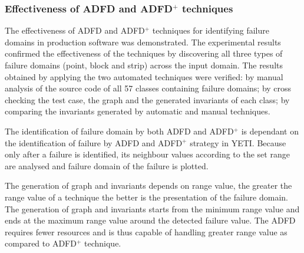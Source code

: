 






\subsubsection{Effectiveness of ADFD and ADFD$^+$ techniques}
The effectiveness of ADFD and ADFD$^+$ techniques for identifying failure domains in production software was demonstrated. The experimental results confirmed the effectiveness of the techniques by discovering all three types of failure domains (point, block and strip) across the input domain. The results obtained by applying the two automated techniques were verified: by manual analysis of the source code of all 57 classes containing failure domains; by cross checking the test case, the graph and the generated invariants of each class; by comparing the invariants generated by automatic and manual techniques. 

The identification of failure domain by both ADFD and ADFD$^+$ is dependant on the identification of failure by ADFD and ADFD$^+$ strategy in YETI. Because only after a failure is identified, its neighbour values according to the set range are analysed and failure domain of the failure is plotted.

The generation of graph and invariants depends on range value, the greater the range value of a technique the better is the presentation of the failure domain. The generation of graph and invariants starts from the minimum range value and ends at the maximum range value around the detected failure value. The ADFD requires fewer resources and is thus capable of handling  greater range value as compared to ADFD$^+$ technique.  




